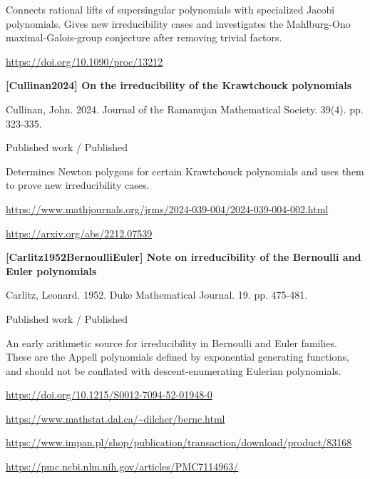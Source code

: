 \documentclass[11pt,a4paper,oneside,openany]{book}
\begin{document}
\color{black} Connects rational lifts of supersingular polynomials with specialized Jacobi polynomials. Gives new irreducibility cases and investigates the Mahlburg-Ono maximal-Galois-group conjecture after removing trivial factors.\par
{\footnotesize\url{https://doi.org/10.1090/proc/13212}}\par
\vspace{9pt}
\hypertarget{ref:Cullinan2024}{}
{\sffamily\bfseries\color{atlasgreen}[Cullinan2024] On the irreducibility of the Krawtchouck polynomials}\par
\color{black} Cullinan, John. 2024. Journal of the Ramanujan Mathematical Society. 39(4). pp. 323-335.\par
{\small\sffamily\color{atlasgold}Published work / Published}\par
\color{black} Determines Newton polygons for certain Krawtchouck polynomials and uses them to prove new irreducibility cases.\par
{\footnotesize\url{https://www.mathjournals.org/jrms/2024-039-004/2024-039-004-002.html}}\par
{\footnotesize\url{https://arxiv.org/abs/2212.07539}}\par
\vspace{9pt}
\hypertarget{ref:Carlitz1952BernoulliEuler}{}
{\sffamily\bfseries\color{atlasgreen}[Carlitz1952BernoulliEuler] Note on irreducibility of the Bernoulli and Euler polynomials}\par
\color{black} Carlitz, Leonard. 1952. Duke Mathematical Journal. 19. pp. 475-481.\par
{\small\sffamily\color{atlasgold}Published work / Published}\par
\color{black} An early arithmetic source for irreducibility in Bernoulli and Euler families. These are the Appell polynomials defined by exponential generating functions, and should not be conflated with descent-enumerating Eulerian polynomials.\par
{\footnotesize\url{https://doi.org/10.1215/S0012-7094-52-01948-0}}\par
{\footnotesize\url{https://www.mathstat.dal.ca/~dilcher/bernc.html}}\par
{\footnotesize\url{https://www.impan.pl/shop/publication/transaction/download/product/83168}}\par
{\footnotesize\url{https://pmc.ncbi.nlm.nih.gov/articles/PMC7114963/}}\par
\vspace{9pt}
\end{document}
